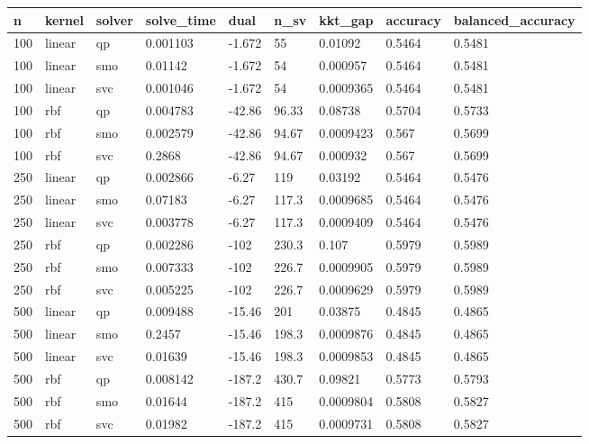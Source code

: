 \begin{tabular}{lllllllll}
\hline
n & kernel & solver & solve\_time & dual & n\_sv & kkt\_gap & accuracy & balanced\_accuracy \\
\hline
100 & linear & qp & 0.001103 & -1.672 & 55 & 0.01092 & 0.5464 & 0.5481 \\
100 & linear & smo & 0.01142 & -1.672 & 54 & 0.000957 & 0.5464 & 0.5481 \\
100 & linear & svc & 0.001046 & -1.672 & 54 & 0.0009365 & 0.5464 & 0.5481 \\
100 & rbf & qp & 0.004783 & -42.86 & 96.33 & 0.08738 & 0.5704 & 0.5733 \\
100 & rbf & smo & 0.002579 & -42.86 & 94.67 & 0.0009423 & 0.567 & 0.5699 \\
100 & rbf & svc & 0.2868 & -42.86 & 94.67 & 0.000932 & 0.567 & 0.5699 \\
250 & linear & qp & 0.002866 & -6.27 & 119 & 0.03192 & 0.5464 & 0.5476 \\
250 & linear & smo & 0.07183 & -6.27 & 117.3 & 0.0009685 & 0.5464 & 0.5476 \\
250 & linear & svc & 0.003778 & -6.27 & 117.3 & 0.0009409 & 0.5464 & 0.5476 \\
250 & rbf & qp & 0.002286 & -102 & 230.3 & 0.107 & 0.5979 & 0.5989 \\
250 & rbf & smo & 0.007333 & -102 & 226.7 & 0.0009905 & 0.5979 & 0.5989 \\
250 & rbf & svc & 0.005225 & -102 & 226.7 & 0.0009629 & 0.5979 & 0.5989 \\
500 & linear & qp & 0.009488 & -15.46 & 201 & 0.03875 & 0.4845 & 0.4865 \\
500 & linear & smo & 0.2457 & -15.46 & 198.3 & 0.0009876 & 0.4845 & 0.4865 \\
500 & linear & svc & 0.01639 & -15.46 & 198.3 & 0.0009853 & 0.4845 & 0.4865 \\
500 & rbf & qp & 0.008142 & -187.2 & 430.7 & 0.09821 & 0.5773 & 0.5793 \\
500 & rbf & smo & 0.01644 & -187.2 & 415 & 0.0009804 & 0.5808 & 0.5827 \\
500 & rbf & svc & 0.01982 & -187.2 & 415 & 0.0009731 & 0.5808 & 0.5827 \\
\hline
\end{tabular}
